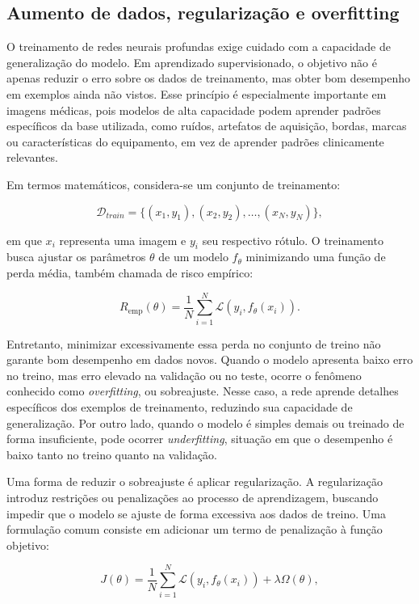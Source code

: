 \documentclass[
    12pt,
    openright,
    oneside,
    a4paper,
    english,
    brazil
]{abntex2}
\begin{document}
\subsection{Aumento de dados, regularização e overfitting}
\label{subsec:aumento_regularizacao_overfitting}

O treinamento de redes neurais profundas exige cuidado com a capacidade de generalização do modelo. Em aprendizado supervisionado, o objetivo não é apenas reduzir o erro sobre os dados de treinamento, mas obter bom desempenho em exemplos ainda não vistos. Esse princípio é especialmente importante em imagens médicas, pois modelos de alta capacidade podem aprender padrões específicos da base utilizada, como ruídos, artefatos de aquisição, bordas, marcas ou características do equipamento, em vez de aprender padrões clinicamente relevantes.

Em termos matemáticos, considera-se um conjunto de treinamento:

\[
\mathcal{D}_{train} = \{(x_1,y_1),(x_2,y_2),\ldots,(x_N,y_N)\},
\]

em que \(x_i\) representa uma imagem e \(y_i\) seu respectivo rótulo. O treinamento busca ajustar os parâmetros \(\theta\) de um modelo \(f_{\theta}\) minimizando uma função de perda média, também chamada de risco empírico:

\[
R_{\text{emp}}(\theta) =
\frac{1}{N}
\sum_{i=1}^{N}
\mathcal{L}(y_i, f_{\theta}(x_i)).
\]

Entretanto, minimizar excessivamente essa perda no conjunto de treino não garante bom desempenho em dados novos. Quando o modelo apresenta baixo erro no treino, mas erro elevado na validação ou no teste, ocorre o fenômeno conhecido como \textit{overfitting}, ou sobreajuste. Nesse caso, a rede aprende detalhes específicos dos exemplos de treinamento, reduzindo sua capacidade de generalização. Por outro lado, quando o modelo é simples demais ou treinado de forma insuficiente, pode ocorrer \textit{underfitting}, situação em que o desempenho é baixo tanto no treino quanto na validação.

Uma forma de reduzir o sobreajuste é aplicar regularização. A regularização introduz restrições ou penalizações ao processo de aprendizagem, buscando impedir que o modelo se ajuste de forma excessiva aos dados de treino. Uma formulação comum consiste em adicionar um termo de penalização à função objetivo:

\[
J(\theta) =
\frac{1}{N}
\sum_{i=1}^{N}
\mathcal{L}(y_i, f_{\theta}(x_i))
+
\lambda \Omega(\theta),
\]
\end{document}
